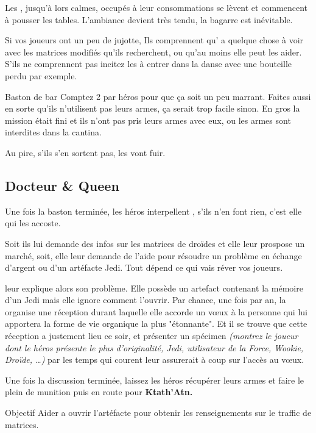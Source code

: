Les , jusqu’à lors calmes, occupés à leur consommations se lèvent et commencent à pousser les tables. L’ambiance devient très tendu, la bagarre est inévitable. 

Si vos joueurs ont un peu de jujotte, Ils comprennent qu’ a quelque chose à voir avec les matrices modifiés qu’ils recherchent, ou qu’au moins elle peut les aider. S’ils ne comprennent pas incitez les à entrer dans la danse avec une bouteille perdu par exemple.

\begin{paperbox}{Baston de bar}
Comptez 2  par héros pour que ça soit un peu marrant. Faites aussi en sorte qu’ils n’utilisent pas leurs armes, ça serait trop facile sinon. En gros la mission était fini et ils n’ont pas pris leurs armes avec eux, ou les armes sont interdites dans la cantina.

Au pire, s’ils s’en sortent pas, les  vont fuir.
\end{paperbox}

\subsection{Docteur \& Queen}

Une fois la baston terminée, les héros interpellent , s’ils n’en font rien, c’est elle qui les accoste.

Soit ils lui demande des infos sur les matrices de droïdes et elle leur prospose un marché, soit, elle leur demande de l’aide pour résoudre un problème en échange d’argent ou d’un artéfacte Jedi. Tout dépend ce qui vais réver vos joueurs.

 leur explique alors son problème. Elle possède un artefact contenant la mémoire d’un Jedi mais elle ignore comment l’ouvrir. Par chance, une fois par an, la  organise une réception durant laquelle elle accorde un vœux à la personne qui lui apportera la forme de vie organique la plus "étonnante". Et il se trouve que cette réception a justement lieu ce soir, et présenter un spécimen \textit{(montrez le joueur dont le héros présente le plus d’originalité, Jedi, utilisateur de la Force, Wookie, Droïde, \dots)} par les temps qui courent leur assurerait à coup sur l’accès au vœux.

\bigbreak

Une fois la discussion terminée, laissez les héros récupérer leurs armes et faire le plein de munition puis en route pour \textbf{Ktath’Atn.}

\begin{paperbox}{Objectif}
Aider  a ouvrir l’artéfacte pour obtenir les renseignements sur le traffic de matrices.
\end{paperbox}